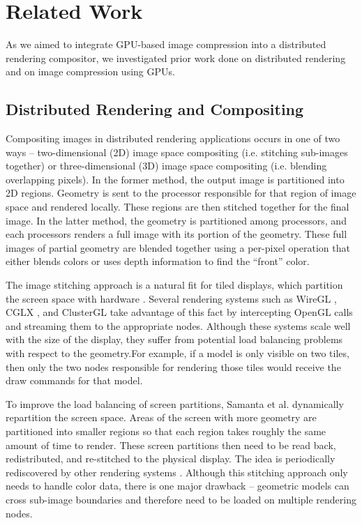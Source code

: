 \documentclass{vgtc}                          %
\begin{document}
\section{Related Work}
As we aimed to integrate GPU-based image compression into a distributed rendering compositor, we investigated prior work done on distributed rendering and on image compression using GPUs.

\subsection{Distributed Rendering and Compositing}
Compositing images in distributed rendering applications occurs in one of two ways -- two-dimensional (2D) image space compositing (i.e. stitching sub-images together) or three-dimensional (3D) image space compositing (i.e. blending overlapping pixels).
In the former method, the output image is partitioned into 2D regions. Geometry is sent to the processor responsible for that region of image space and rendered locally. These regions are then stitched together for the final image.
In the latter method, the geometry is partitioned among processors, and each processors renders a full image with its portion of the geometry. These full images of partial geometry are blended together using a per-pixel operation that either blends colors or uses depth information to find the ``front'' color.

The image stitching approach is a natural fit for tiled displays, which partition the screen space with hardware \cite{Hereld2000}. Several rendering systems such as WireGL \cite{Humphreys_2001}, CGLX \cite{Doerr_2011}, and ClusterGL \cite{Neal2011} take advantage of this fact by intercepting OpenGL calls and streaming them to the appropriate nodes. Although these systems scale well with the size of the display, they suffer from potential load balancing problems with respect to the geometry.For example, if a model is only visible on two tiles, then only the two nodes responsible for rendering those tiles would receive the draw commands for that model.

To improve the load balancing of screen partitions, Samanta et al. \cite{Samanta1999} dynamically repartition the screen space.
Areas of the screen with more geometry are partitioned into smaller regions so that each region takes roughly the same amount of time to render.
These screen partitions then need to be read back, redistributed, and re-stitched to the physical display.
The idea is periodically rediscovered by other rendering systems \cite{Revanth_2012,Dong2019}.
Although this stitching approach only needs to handle color data, there is one major drawback -- geometric models can cross sub-image boundaries and therefore need to be loaded on multiple rendering nodes.
\end{document}
